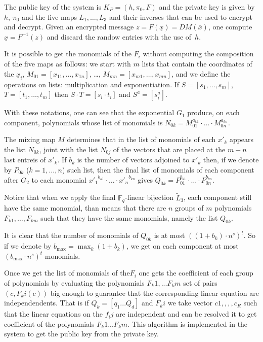 \documentclass[12pt,a4paper]{amsart}
\theoremstyle{remark}
\theoremstyle{definition}
\newcommand\gfq{{\mathbb{F}_q}}
\begin{document}
The public key of the system is $K_P=(h,\pi_0,F)$ and the private key is
given by $h$, $\pi_0$ and the five maps $L_1,\dots,L_3$ and their inverses
that can be used to encrypt and decrypt. Given an encrypted message $z=F(\underline{x})=
DM(\overline{x})$, one compute $\underline{x}=F^{-1}(z)$ and discard the randow entries
with the use of~$h$.

It is possible to get the monomials of the $F_i$ without computing the composition
of the five maps as follows: we start with $m$ lists that contain
the coordinates of the $\underline{x}_i$, $M_{01}=[x_{11},\dots,x_{1n}]$, \dots,
$M_{mn}=[x_{m1},\dots,x_{mn}]$, and we define the operations on lists: multiplication
and exponentiation. If $S=[s_1,\dots,s_m]$, $T=[t_1,\dots,t_m]$ then
$S\cdot T=[s_i\cdot t_i]$ and $S^a=[s_i^a]$.

With these notations, one can see that the exponential $G_1$ produce, on each component,
polynomials whose list of monomials is $N_{0k}=M_{01}^{a_{k1}}\cdot\ldots\cdot M_{0n}^{a_{kn}}$.

The mixing map $M$ determines that in the list of monomials of each $x'_k$ appears
the list $N_{0k}$, joint with the list $N_{0j}$ of the vectors that are placed
at the $m-n$ last entreis of $x'_k$. If $b_k$ is the number of vectors adjoined
to $x'_k$ then, if we denote by $P_{0k}$ ($k=1,\dots,n$) such list, then the final
list of monomials of each component after $G_2$ to each monomial ${x'_1}^{b_{k1}}\cdot\ldots\cdot{x'_n}^{b_{kn}}$ gives $Q_{0k}=P_{01}^{b_{k1}}\cdot\ldots\cdot P_{0n}^{b_{kn}}$.

Notice that when we apply the final $\gfq$-linear bijection $\tilde{L}_3$,
each component still have the same monomial, than means that there are $n$ groups
of $m$ polynomials $F_{k1},\dots,F_{km}$ such that they have the same monomials,
namely the list $Q_{0k}$.

It is clear that the number of monomials of $Q_{0k}$ is at most $((1+b_k)\cdot n^s)^t$.
So if we denote by $b_{\max}=\max_k(1+b_k)$, we get on each component
at most $(b_{\max}\cdot n^s)^t$ monomials.




Once we get the list of monomials of the$F_i$
one gets the coefficient of each group of polynomials by evaluating the polynomials
$F_k1,...F_km$ set of pairs $(c,F_ki(c))$
big enough to guarantee that the corresponding linear equation are independendents. 
That is if $Q_k=[q_1...Q_d]$ and $F_ki$ 
we take vector $c1,,,,c_R$ such that the linear equations on the $f_ij$ 
 are independent and can be resolved it to get coefficient of the polynomials $F_k1...F_km$.
This algorithm is implemented in the system to get the public key from the private key.
 
\end{document}
